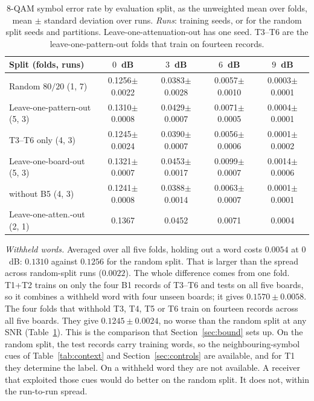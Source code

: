 \documentclass{ieeeaccess}
\begin{document}
\begin{table}[!t]
\caption{8-QAM symbol error rate by evaluation split, as the unweighted mean
over folds, mean $\pm$ standard deviation over runs. \emph{Runs}: training
seeds, or for the random split seeds and partitions. Leave-one-attenuation-out
has one seed. T3--T6 are the leave-one-pattern-out folds that train on
fourteen records.}
\label{tab:splits}
\centering
\setlength{\tabcolsep}{3pt}
\begin{tabular}{lcccc}
\toprule
Split (folds, runs) & $0$~dB & $3$~dB & $6$~dB & $9$~dB \\
\midrule
Random $80/20$ (1, 7) & 0.1256$\pm$0.0022 & 0.0383$\pm$0.0028 & 0.0057$\pm$0.0010 & 0.0003$\pm$0.0001 \\
Leave-one-pattern-out (5, 3) & 0.1310$\pm$0.0008 & 0.0429$\pm$0.0007 & 0.0071$\pm$0.0005 & 0.0004$\pm$0.0001 \\
\quad T3--T6 only (4, 3) & 0.1245$\pm$0.0024 & 0.0390$\pm$0.0007 & 0.0056$\pm$0.0006 & 0.0001$\pm$0.0002 \\
Leave-one-board-out (5, 3) & 0.1321$\pm$0.0007 & 0.0453$\pm$0.0017 & 0.0099$\pm$0.0007 & 0.0014$\pm$0.0006 \\
\quad without B5 (4, 3) & 0.1241$\pm$0.0008 & 0.0388$\pm$0.0014 & 0.0063$\pm$0.0007 & 0.0001$\pm$0.0001 \\
Leave-one-atten.-out (2, 1) & 0.1367 & 0.0452 & 0.0071 & 0.0004 \\
\bottomrule
\end{tabular}
\end{table}

\emph{Withheld words.} Averaged over all five folds, holding out a word costs
$0.0054$ at $0$~dB: $0.1310$ against $0.1256$ for the random split. That is
larger than the spread across random-split runs ($0.0022$). The whole
difference comes from one fold. T1+T2 trains on only the four B1 records of
T3--T6 and tests on all five boards, so it combines a withheld word with four
unseen boards; it gives $0.1570 \pm 0.0058$. The four folds that withhold T3,
T4, T5 or T6 train on fourteen records across all five boards. They give
$0.1245 \pm 0.0024$, no worse than the random split at any SNR
(Table~\ref{tab:splits}). This is the comparison that Section~\ref{sec:bound}
sets up. On the random split, the test records carry training words, so the
neighbouring-symbol cues of Table~\ref{tab:context} and
Section~\ref{sec:controls} are available, and for T1 they determine the label.
On a withheld word they are not available. A receiver that exploited those
cues would do better on the random split. It does not, within the run-to-run
spread.
\end{document}
